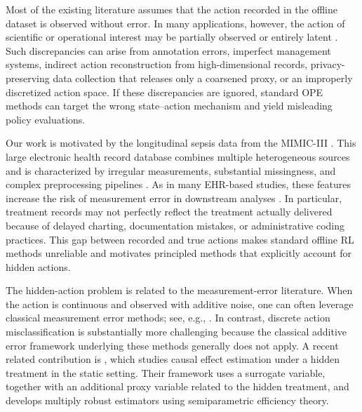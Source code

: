 \documentclass[12pt]{article}
\newcommand{\0}{\boldsymbol{0}}
\begin{document}
Most of the existing literature assumes that the action recorded in the offline dataset is observed without error. In many applications, however, the action of scientific or operational interest may be partially observed or entirely latent \citep{young2018measurement,zhu2022causal}. Such discrepancies can arise from annotation errors, imperfect management systems, indirect action reconstruction from high-dimensional records, privacy-preserving data collection that releases only a coarsened proxy, or an improperly discretized action space. If these discrepancies are ignored, standard OPE methods can target the wrong state--action mechanism and yield misleading policy evaluations.


Our work is motivated by the longitudinal sepsis data from the MIMIC-III \citep{johnson2016mimic}. This large electronic health record database combines multiple heterogeneous sources and is characterized by irregular measurements, substantial missingness, and complex preprocessing pipelines \citep{gupta2022extensive}. As in many EHR-based studies, these features increase the risk of measurement error in downstream analyses \citep{rogers2021medical}. In particular, treatment records may not perfectly reflect the treatment actually delivered because of delayed charting, documentation mistakes, or administrative coding practices. This gap between recorded and true actions makes standard offline RL methods unreliable and motivates principled methods that explicitly account for hidden actions.

The hidden-action problem is related to the measurement-error literature. When the action is continuous and observed with additive noise, one can often leverage classical measurement error methods; see, e.g., \citet{carroll2006measurement}. In contrast, discrete action misclassification is substantially more challenging because the classical additive error framework underlying these methods generally does not apply. A recent related contribution is \citet{zhou2024causal}, which studies causal effect estimation under a hidden treatment in the static setting. Their framework uses a surrogate variable, together with an additional proxy variable related to the hidden treatment, and develops multiply robust estimators using semiparametric efficiency theory. 
\end{document}
